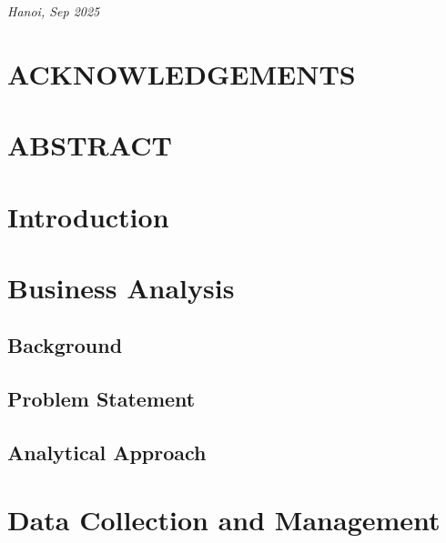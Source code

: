 \documentclass[a4paper,12pt]{report}
\begin{document}
\vfill

\begin{center}
    \textit{Hanoi, Sep 2025}
\end{center}
\newpage
{} 
\setcounter{page}{2}  


\tableofcontents  %

\newpage

\chapter*{ACKNOWLEDGEMENTS}

\chapter*{ABSTRACT}

\chapter{Introduction}

\chapter{Business Analysis}
\section{Background}
\section{Problem Statement}
\section{Analytical Approach}
\chapter{Data Collection and Management}
\end{document}
